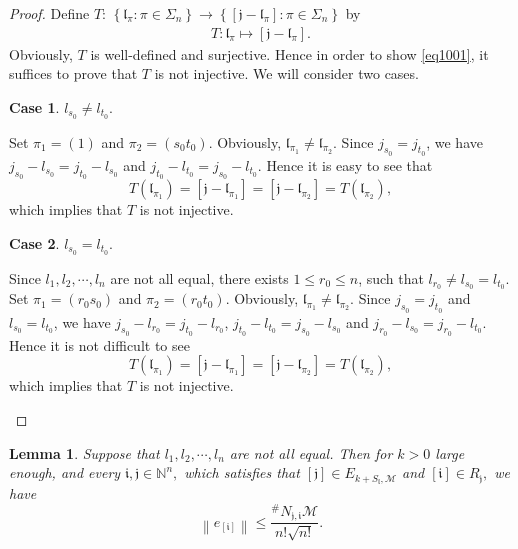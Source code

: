 \documentclass[11pt]{article}
\theoremstyle{plain}
\newtheorem{lem}[thm]{Lemma}
\theoremstyle{definition}
\newtheorem{case}{Case}
\begin{document}
\begin{proof}
	
	Define $T \colon  \, \left \{ \mathfrak{l}_{\pi} :\pi \in \Sigma_{n} \right \}   \to \left \{[\mathfrak{j}-\mathfrak{l}_{\pi}] :\pi \in \Sigma_{n} \right \}$ by
\begin{align*}
T:	 \mathfrak{l}_{\pi}  \mapsto[\mathfrak{j}-\mathfrak{l}_{\pi}].
\end{align*}
Obviously, $T$ is well-defined and
surjective. Hence in order to show \eqref{eq1001}, it suffices to prove that $T$ is not injective. We will consider two cases.
\begin{case}$l_{s_0} \ne l_{t_0}.$
	
 
	Set $\pi_1=(1)$ and $\pi_2=\left ( s_0t_0 \right )$. Obviously,
	$\mathfrak{l}_{\pi_1}  \ne  \mathfrak{l}_{\pi_2}.$
	Since $j_{s_0}=j_{t_0}$, we have $j_{s_0}-l_{s_0}=j_{t_0}-l_{s_0}$ and $j_{t_0}-l_{t_0}=j_{s_0}-l_{t_0}$.
	Hence it is easy to see that $$ T\left( \mathfrak{l}_{\pi_1} \right) =[\mathfrak{j}-\mathfrak{l}_{\pi_1}]=[\mathfrak{j}-\mathfrak{l}_{\pi_2}]=T\left( \mathfrak{l}_{\pi_2}\right),$$ which implies that $T$ is not injective.
\end{case}
\begin{case}$l_{s_0}=l_{t_0}.$
	
	Since $l_{1},l_{2},\cdots,l_{n}$  are not all equal, there exists $1 \leq r_0 \leq n$, such that $l_{r_0} \neq l_{s_0}=l_{t_0}$.
Set $ \pi_1=(r_0s_0)$ and $ \pi_2= (r_0t_0)$.
	Obviously, $\mathfrak{l}_{\pi_1}  \ne  \mathfrak{l}_{\pi_2}.$ 
Since $j_{s_0}=j_{t_0}$ and $l_{s_0}=l_{t_0}$, we have $j_{s_0}-l_{r_0}=j_{t_0}-l_{r_0}$, $j_{t_0}-l_{t_0}=j_{s_0}-l_{s_0}$ and $j_{r_0}-l_{s_0}=j_{r_0}-l_{t_0}$.
Hence it is not difficult to see $$ T\left( \mathfrak{l}_{\pi_1} \right) =[\mathfrak{j}-\mathfrak{l}_{\pi_1}]=[\mathfrak{j}-\mathfrak{l}_{\pi_2}]=T\left( \mathfrak{l}_{\pi_2}\right),$$ which implies that $T$ is not injective. \qedhere
\end{case}
\end{proof}
\begin{lem}\label{lem175}
	Suppose that $l_{1},l_{2},\cdots,l_{n}$  are not all equal. Then for $k>0$ large enough, and every $\mathfrak{i},\mathfrak{j} \in \mathbb{N}^n,$ which satisfies that
$[\mathfrak{j}] \in E_{k+S_{\mathfrak{l}},\mathscr{M}}$ 
and $[\mathfrak{i}] \in R_{\mathfrak{j} },$
we have 
$$
\left \|  e_{[\mathfrak{i}]}  \right \|\leq \frac{^{\#  } N_{\mathfrak{j},\mathfrak{i} }\mathscr{M}}{n!\sqrt{n!}}.
$$
\end{lem}
\end{document}
